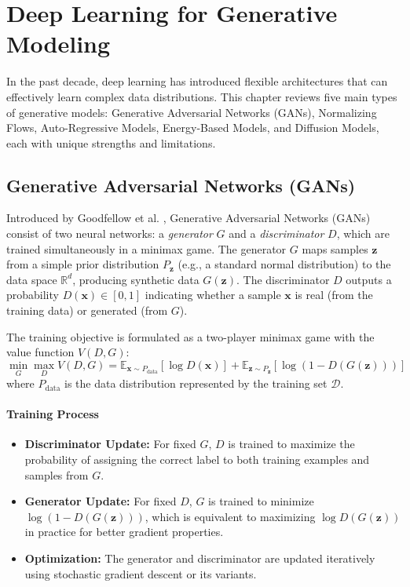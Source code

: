\section{Deep Learning for Generative Modeling}
In the past decade, deep learning has introduced flexible architectures that can effectively learn complex data distributions. This chapter reviews five main types of generative models: Generative Adversarial Networks (GANs), Normalizing Flows, Auto-Regressive Models, Energy-Based Models, and Diffusion Models, each with unique strengths and limitations.

\subsection{Generative Adversarial Networks (GANs)}
Introduced by Goodfellow et al. \cite{goodfellow2014generative}, Generative Adversarial Networks (GANs) consist of two neural networks: a \textit{generator} \( G \) and a \textit{discriminator} \( D \), which are trained simultaneously in a minimax game. The generator \( G \) maps samples \( \mathbf{z} \) from a simple prior distribution \( P_{\mathbf{z}} \) (e.g., a standard normal distribution) to the data space \( \mathbb{R}^d \), producing synthetic data \( G(\mathbf{z}) \). The discriminator \( D \) outputs a probability \( D(\mathbf{x}) \in [0,1] \) indicating whether a sample \( \mathbf{x} \) is real (from the training data) or generated (from \( G \)).

The training objective is formulated as a two-player minimax game with the value function \( V(D, G) \):
\[
\min_{G} \max_{D} V(D, G) = \mathbb{E}_{\mathbf{x} \sim P_{\text{data}}} [\log D(\mathbf{x})] + \mathbb{E}_{\mathbf{z} \sim P_{\mathbf{z}}} [\log (1 - D(G(\mathbf{z})))]
\]
where \( P_{\text{data}} \) is the data distribution represented by the training set \( \mathcal{D} \).

\paragraph{Training Process}
\begin{itemize}
    \item \textbf{Discriminator Update:} For fixed \( G \), \( D \) is trained to maximize the probability of assigning the correct label to both training examples and samples from \( G \).
    \item \textbf{Generator Update:} For fixed \( D \), \( G \) is trained to minimize \( \log (1 - D(G(\mathbf{z}))) \), which is equivalent to maximizing \( \log D(G(\mathbf{z})) \) in practice for better gradient properties.
    \item \textbf{Optimization:} The generator and discriminator are updated iteratively using stochastic gradient descent or its variants.
\end{itemize}

